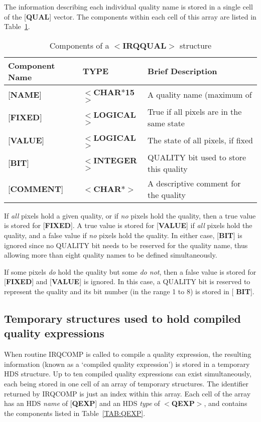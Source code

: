 \documentclass[twoside,11pt]{article}
\newcommand{\htmlref}[2]{#1}
\newcommand{\latex}[1]{#1}
\newcommand{\html}[1]{}
\newcommand{\latexhtml}[2]{#1}
\renewcommand{\_}{\texttt{\symbol{95}}}
\begin{document}
The information describing each individual quality name is stored in a single
cell of the {[}{\bf QUAL}{]} vector. The components within each cell of this 
array are listed in 
\latexhtml{Table~\ref {TAB:QUAL}}{Table~2}.

\begin{table}[htb]
\centering
\latex{\caption{Components of a $<${\bf IRQ\_QUAL}$>$ structure}}
\html{\caption{{\bf 2:} Components of a $<${\bf IRQ\_QUAL}$>$ structure}}
\label{TAB:QUAL}
\begin{tabular}{|l|l|l|}
\hline
Component Name & TYPE & Brief Description \\ \hline
{[}{\bf NAME}{]} & $<${\bf \_CHAR$\ast$15}$>$ & A quality name (maximum of
\\
{[}{\bf FIXED}{]} & $<${\bf \_LOGICAL}$>$ & True if all pixels are in the same 
state\\
{[}{\bf VALUE}{]} & $<${\bf \_LOGICAL}$>$ & The state of all pixels, if fixed\\
{[}{\bf BIT}{]} & $<${\bf \_INTEGER}$>$ & QUALITY bit used to store this 
quality\\
{[}{\bf COMMENT}{]} & $<${\bf \_CHAR$\ast$}$>$ & A descriptive comment for the 
quality\\
\hline
\end{tabular}
\end{table}

If {\em all} pixels hold a given quality, or if {\em no} pixels hold
the quality, then a true value is stored for {[}{\bf FIXED}{]}. A true
value is stored for {[}{\bf VALUE}{]} if {\em all} pixels hold the
quality, and a false value if {\em no} pixels hold the quality. In
either case, {[}{\bf BIT}{]} is ignored since no QUALITY bit needs to
be reserved for the quality name, thus allowing more than eight
quality names to be defined simultaneously. 

If some pixels {\em do} hold the quality but some {\em do not}, then a
false value is stored for {[}{\bf FIXED}{]} and {[}{\bf VALUE}{]} is
ignored. In this case, a QUALITY bit is reserved to represent the
quality and its bit number (in the range 1 to 8) is stored in {[}{\bf
BIT}{]}.

\subsection{Temporary structures used to hold compiled quality
expressions} When routine \htmlref{IRQ\_COMP}{IRQ_COMP} is called to
compile a quality expression, the resulting information (known as a
`compiled quality expression') is stored in a temporary HDS structure.
Up to ten compiled quality expressions can exist simultaneously, each
being stored in one cell of an array of temporary structures. The
identifier returned by IRQ\_COMP is just an index within this array.
Each cell of the array has an HDS {\em name} of {[}{\bf QEXP}{]} and
an HDS {\em type} of $<${\bf QEXP}$>$, and contains the components
listed in \latexhtml{Table~\ref {TAB:QEXP}}{Table 3}. 
\end{document}
